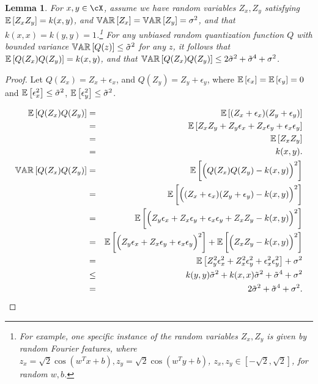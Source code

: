 \documentclass[12pt]{article}
\newcommand{\sq}{\sqrt{2}}
\newcommand{\eps}{\epsilon}
\newcommand{\tsigma}{\tilde{\sigma}}
\newtheorem{lemma}[theorem]{Lemma}
\begin{document}
\begin{lemma}
\label{lemma:var1}
For $x,y\in\cX$, assume we have random variables $Z_x,Z_y$ satisfying $\expect{}{Z_xZ_y} = k(x,y)$, and $\var{}{Z_x} = \var{}{Z_y} = \sigma^2$, and that $k(x,x) = k(y,y) = 1$.\footnote{For example, one specific instance of the random variables $Z_x,Z_y$ is given by random Fourier features, where $z_x = \sq\cos(w^Tx+b),z_y = \sq\cos(w^Ty+b)$, $z_x,z_y\in[-\sq,\sq]$, for random $w,b$.}  For any unbiased random quantization function $Q$ with bounded variance $\var{}{Q(z)} \leq \tsigma^2$ for any $z$, it follows that $\expect{}{Q(Z_x)Q(Z_y)} = k(x,y)$, and that $\var{}{Q(Z_x)Q(Z_y)} \leq 2\tsigma^2 + \tsigma^4 + \sigma^2$.
\end{lemma}
\begin{proof}
Let $Q(Z_x) = Z_x + \eps_x$, and $Q(Z_y) = Z_y + \eps_y$, where $\expect{}{\eps_x} =\expect{}{\eps_y} = 0$ and $\expect{}{\eps_x^2} \leq \tsigma^2$, $\expect{}{\eps_y^2} \leq \tsigma^2$.

\begin{eqnarray*}
\expect{}{Q(Z_x)Q(Z_y)} &=& \expect{}{(Z_x + \eps_x)(Z_y + \eps_y)} \\
&=& \expect{}{Z_xZ_y + Z_y \eps_x + Z_x \eps_y + \eps_x \eps_y} \\
&=& \expect{}{Z_xZ_y} \\
&=& k(x,y).\\
\var{}{Q(Z_x)Q(Z_y)} &=&  \expect{}{\Big(Q(Z_x)Q(Z_y) - k(x,y)\Big)^2} \\
&=& \expect{}{\Big((Z_x + \eps_x)(Z_y + \eps_y) - k(x,y)\Big)^2} \\
&=& \expect{}{\Big(Z_y \eps_x + Z_x\eps_y + \eps_x \eps_y +  Z_xZ_y - k(x,y)\Big)^2} \\
&=& \expect{}{\Big(Z_y \eps_x + Z_x\eps_y + \eps_x \eps_y\Big)^2} +  \expect{}{\Big(Z_xZ_y - k(x,y)\Big)^2} \\
&=& \expect{}{Z_y^2 \eps_x^2 + Z_x^2\eps_y^2 + \eps_x^2 \eps_y^2} +  \sigma^2 \\
&\leq& k(y,y) \tsigma^2 + k(x,x) \tsigma^2 + \tsigma^4 +  \sigma^2 \\
&=& 2\tsigma^2 + \tsigma^4 +  \sigma^2. 
\end{eqnarray*}
\end{proof}
\end{document}
